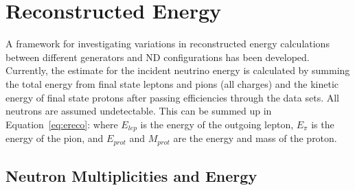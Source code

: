 \documentclass[12pt]{article}
\begin{document}
\section{Reconstructed Energy}\label{sec:Reco}

A framework for investigating variations in reconstructed energy calculations between different generators and ND configurations has been developed. %
Currently, the estimate for the incident neutrino energy is calculated by summing the total energy from final state leptons and pions (all charges) and the kinetic energy of final state protons after passing efficiencies through the data sets. All neutrons are assumed undetectable. 
This can be summed up in Equation~\ref{eq:ereco}:
where $E_{lep}$ is the energy of the outgoing lepton, $E_{\pi}$ is the energy of the pion, and $E_{prot}$ and $M_{prot}$ are the energy and mass of the proton.




\subsection{Neutron Multiplicities and Energy}
\label{subsec:N_multiplicities_Energy}
\end{document}
